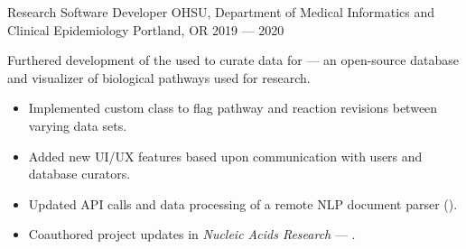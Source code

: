 \showoff
{Research Software Developer}
{OHSU, Department of Medical Informatics and Clinical Epidemiology}
{Portland, OR}
{2019 --- 2020}

Furthered development of the  used to curate data for  --- an open-source database and visualizer of biological pathways used for research.

\begin{itemize}[label=$\triangleright$]
    \item Implemented custom class to flag pathway and reaction revisions between varying data sets.
    \item Added new UI/UX features based upon communication with users and database curators.
    \item Updated API calls and data processing of a remote NLP document parser ().
    \item Coauthored project updates in \emph{Nucleic Acids Research} --- .
\end{itemize}

